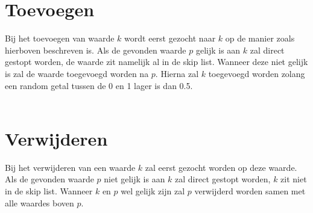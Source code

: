 \section{Toevoegen}
Bij het toevoegen van waarde $k$ wordt eerst gezocht naar $k$ op de manier zoals hierboven beschreven is. Als de gevonden waarde $p$ gelijk is aan $k$ zal direct gestopt worden, de waarde zit namelijk al in de skip list. Wanneer deze niet gelijk is zal de waarde toegevoegd worden na $p$. Hierna zal $k$ toegevoegd worden zolang een random getal tussen de 0 en 1 lager is dan 0.5.\\
\\
\section{Verwijderen}
Bij het verwijderen van een waarde $k$ zal eerst gezocht worden op deze waarde. Als de gevonden waarde $p$ niet gelijk is aan $k$ zal direct gestopt worden, $k$ zit niet in de skip list. Wanneer $k$ en $p$ wel gelijk zijn zal $p$ verwijderd worden samen met alle waardes boven $p$.\\
